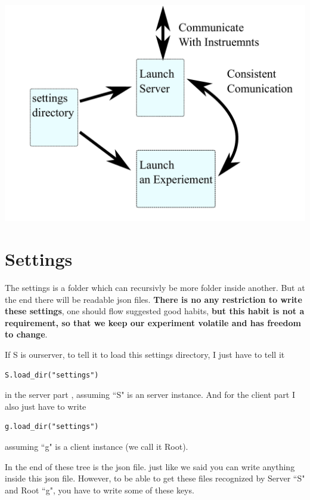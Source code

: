 \documentclass{article}
\begin{document}
\includegraphics[width=\textwidth]{imgs/consistent.pdf}

\section{Settings}
	The settings is a folder which can recursivly be more folder inside another.
But at the end there will be readable json files.
{\bf There is no any restriction to write these settings}, 
	one should flow suggested good habits,
{\bf but this habit is not a requirement, so that we keep our 
	experiment volatile and has freedom to change}.

If S is ourserver, to tell it to load this settings directory, I just have
to tell it 
\begin{lstlisting}
S.load_dir("settings")
\end{lstlisting}
	in the server part , assuming ``S" is an server instance. 
And for the client part I also just have to write 
\begin{lstlisting}
g.load_dir("settings")
\end{lstlisting}
	assuming ``g" is a client instance (we call it Root).

In the end of these tree is the json file. just like we said
you can write anything inside this json file.
However, to be able to get these files recognized by Server ``S" and 
	Root ``g", you have to write some of these keys.
\end{document}
